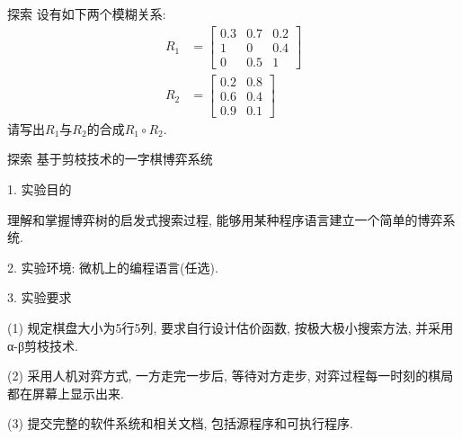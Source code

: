 \begin{custom}[explorecolor]{探索}
设有如下两个模糊关系:
\begin{align*}
R_{1}&=\left[
\begin{array}{ccc}{0.3} & {0.7} & {0.2} \\ {1} & {0} & {0.4} \\ {0} & {0.5} & {1}\end{array}\right]\\
R_{2}&=\left[\begin{array}{cc}{0.2} & {0.8} \\ {0.6} & {0.4} \\ {0.9} & {0.1}\end{array}\right]
\end{align*}请写出$R_1$与$R_2$的合成$R_1\circ R_2$.
\end{custom}
\begin{custom}[explorecolor]{探索}
基于剪枝技术的一字棋博弈系统

    1. 实验目的

    理解和掌握博弈树的启发式搜索过程, 能够用某种程序语言建立一个简单的博弈系统.
    
    2. 实验环境: 微机上的编程语言(任选).

    3. 实验要求

    (1) 规定棋盘大小为5行5列, 要求自行设计估价函数, 按极大极小搜索方法, 并采用α-β剪枝技术.

    (2) 采用人机对弈方式, 一方走完一步后, 等待对方走步, 对弈过程每一时刻的棋局都在屏幕上显示出来.

    (3) 提交完整的软件系统和相关文档, 包括源程序和可执行程序.
\end{custom}

